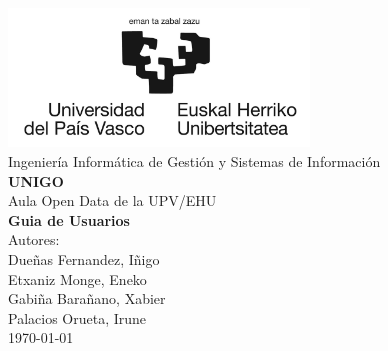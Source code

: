 \documentclass[a4paper,12pt]{report}
\begin{document}
  \begin{titlepage}
      \centering
      \includegraphics[width=0.6\textwidth]{img/logo.jpg}\\
      \vspace{1cm}
      \Large Ingeniería Informática de Gestión y Sistemas de Información\\
      \vspace{3cm}
      \Huge \textbf{UNIGO}\\
      \huge Aula Open Data de la UPV/EHU\\
      \vspace{2cm}
      \huge \textbf{Guia de Usuarios}\\
      \vspace{4cm}
      \Large Autores:\\
      \vspace{0.2cm}
      \large Dueñas Fernandez, Iñigo\\
      \large Etxaniz Monge, Eneko\\
      \large Gabiña Barañano, Xabier\\
      \large Palacios Orueta, Irune\\
      \vfill
      \today
  \end{titlepage}
\end{document}
